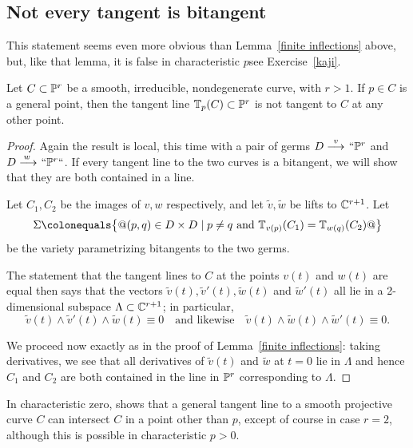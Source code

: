 \subsection*{Not every tangent is bitangent}

 This statement seems even more obvious than Lemma~\ref{finite
 inflections} above, but, like that lemma, it is false in
 characteristic $p$\emdash see Exercise~\ref{kaji}.


 \begin{lemma}\label{tangent not bitangent}
 Let $C \subset \PP^r$ be a smooth, irreducible, nondegenerate curve,
 with $r > 1$. If $p \in C$ is a general point, then the tangent line
 $\TT_p(C) \subset \PP^r$ is not tangent to $C$ at any other point.
\unif
 \end{lemma}

 \begin{proof} Again the result is local, this time with a pair of germs
 $D\ruto {\ v} ` `\PP^r$ and $D\ruto {\,w} ` `\PP^r` `$. If every
 tangent line to the two curves is a bitangent, we will show that they
 are both contained in a line.

  Let $C_1, C_2$ be the images of $v,w$ respectively, and let $\tilde v,
  \tilde w$ be lifts to $\CC^{r+1}$.
 Let
 $$
 \Sigma \colonequals  \bigl\{@ (p,q) \in D \times D \mid p\neq q \text{ and
 }\TT_{v(p)}(C_1) = \TT_{w(q)}(C_2)@ \bigr\}
 $$
 be the variety parametrizing bitangents to the two germs.



 The statement that the tangent lines to $C$ at the points $v(t)$
 and $w(t)$ are equal then says that the vectors $\tilde v(t), \tilde
 v'(t),\tilde w(t)$ and $\tilde w'(t)$ all lie in a 2-dimen\-sional subspace
 $\Lambda \subset \CC^{r+1}$; in particular,
 $$
 \tilde v(t) \wedge \tilde v'(t) \wedge \tilde w(t) \equiv 0 \quad
 \text{and likewise} \quad \tilde v(t) \wedge \tilde w(t) \wedge \tilde
 w'(t) \equiv 0
.
 $$

We proceed now exactly as in the proof of Lemma~\ref{finite inflections}:
taking derivatives, we see that all derivatives of $\tilde v(t)$
and $\tilde w$ at $t=0$ lie in $\Lambda$
and hence $C_1$ and $C_2$ are both contained in the line in $\PP^r$
corresponding to $\Lambda$.
 \end{proof}

In characteristic zero, \cite[Theorem 3.1]{kaji-tangentialDegeneracy}
shows that a general tangent line to a smooth projective curve $C$ can
intersect $C$ in a point other than $p$, except of course in case $r=2$,
although this is possible in characteristic $p>0$.

